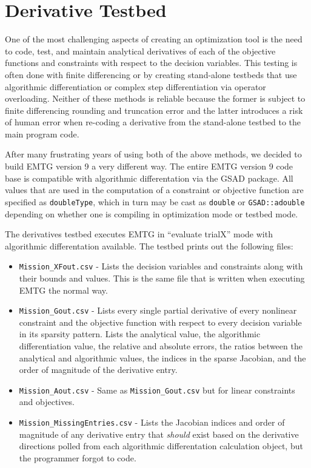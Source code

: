 \chapter{Derivative Testbed}
\label{chap:derivative_testing}

One of the most challenging aspects of creating an optimization tool is the need to code, test, and maintain analytical derivatives of each of the objective functions and constraints with respect to the decision variables. This testing is often done with finite differencing or by creating stand-alone testbeds that use algorithmic differentiation or complex step differentiation via operator overloading. Neither of these methods is reliable because the former is subject to finite differencing rounding and truncation error and the latter introduces a risk of human error when re-coding a derivative from the stand-alone testbed to the main program code.

After many frustrating years of using both of the above methods, we decided to build \ac{EMTG} version 9 a very different way. The entire \ac{EMTG} version 9 code base is compatible with algorithmic differentation via the \ac{GSAD} package. All values that are used in the computation of a constraint or objective function are specified as \texttt{doubleType}, which in turn may be cast as \texttt{double} or \texttt{GSAD::adouble} depending on whether one is compiling in optimization mode or testbed mode.

The derivatives testbed executes \ac{EMTG} in ``evaluate trialX'' mode with algorithmic differentation available. The testbed prints out the following files:

\begin{itemize}
	\item \texttt{Mission\_XFout.csv} - Lists the decision variables and constraints along with their bounds and values. This is the same file that is written when executing \ac{EMTG} the normal way.
	\item \texttt{Mission\_Gout.csv} - Lists every single partial derivative of every nonlinear constraint and the objective function with respect to every decision variable in its sparsity pattern. Lists the analytical value, the algorithmic differentiation value, the relative and absolute errors, the ratios between the analytical and algorithmic values, the indices in the sparse Jacobian, and the order of magnitude of the derivative entry.
	\item \texttt{Mission\_Aout.csv} - Same as \texttt{Mission\_Gout.csv} but for linear constraints and objectives.
	\item \texttt{Mission\_MissingEntries.csv} - Lists the Jacobian indices and order of magnitude of any derivative entry that \textit{should} exist based on the derivative directions polled from each algorithmic differentation calculation object, but the programmer forgot to code.
\end{itemize}

